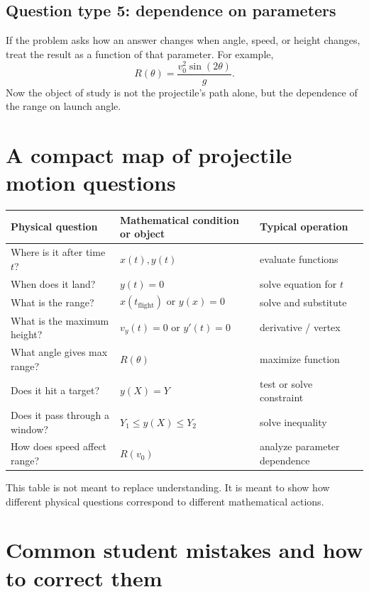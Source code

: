 \documentclass[11pt,a4paper]{article}
\begin{document}
\subsection{Question type 5: dependence on parameters}

If the problem asks how an answer changes when angle, speed, or height changes, treat the result as a function of that parameter. For example,
\[
R(\theta)=\frac{v_0^2\sin(2\theta)}{g}.
\]
Now the object of study is not the projectile's path alone, but the dependence of the range on launch angle.

\section{A compact map of projectile motion questions}

\begin{center}
\renewcommand{\arraystretch}{1.35}
\begin{tabular}{p{}p{}p{}}
\toprule
Physical question & Mathematical condition or object & Typical operation \\
\midrule
Where is it after time $t$? & $x(t), y(t)$ & evaluate functions \\
When does it land? & $y(t)=0$ & solve equation for $t$ \\
What is the range? & $x(t_{\mathrm{flight}})$ or $y(x)=0$ & solve and substitute \\
What is the maximum height? & $v_y(t)=0$ or $y'(t)=0$ & derivative / vertex \\
What angle gives max range? & $R(\theta)$ & maximize function \\
Does it hit a target? & $y(X)=Y$ & test or solve constraint \\
Does it pass through a window? & $Y_1\le y(X)\le Y_2$ & solve inequality \\
How does speed affect range? & $R(v_0)$ & analyze parameter dependence \\
\bottomrule
\end{tabular}
\end{center}

This table is not meant to replace understanding. It is meant to show how different physical questions correspond to different mathematical actions.

\newpage

\section{Common student mistakes and how to correct them}
\end{document}
